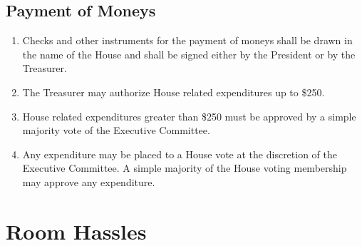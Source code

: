 \documentclass[10pt]{article} %
\begin{document}
\subsection{Payment of Moneys}
\begin{enumerate}
\item Checks and other instruments for the payment of moneys shall be drawn in the name of the House and shall be signed either by the President or by the Treasurer.
\item The Treasurer may authorize House related expenditures up to \$250.
\item House related expenditures greater than \$250 must be approved by a simple majority vote of the Executive Committee.
\item Any expenditure may be placed to a House vote at the discretion of the Executive Committee. A simple majority of the House voting membership may approve any expenditure.
\end{enumerate}
\section{Room Hassles}
\end{document}
